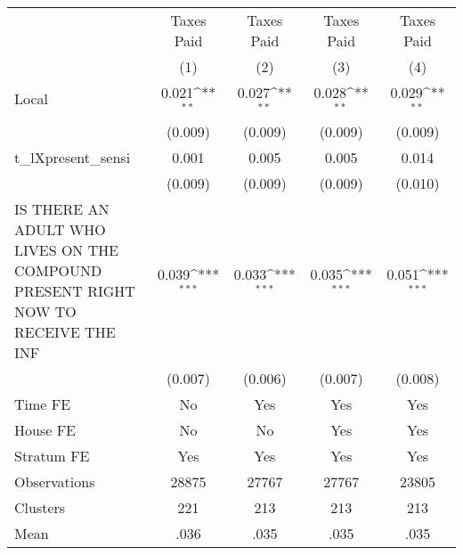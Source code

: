 {
\def\sym#1{\ifmmode^{#1}\else\(^{#1}\)\fi}
\begin{tabular}{l*{4}{c}}
\hline\hline
                &\multicolumn{1}{c}{Taxes Paid}&\multicolumn{1}{c}{Taxes Paid}&\multicolumn{1}{c}{Taxes Paid}&\multicolumn{1}{c}{Taxes Paid}\\
                &\multicolumn{1}{c}{(1)}         &\multicolumn{1}{c}{(2)}         &\multicolumn{1}{c}{(3)}         &\multicolumn{1}{c}{(4)}         \\
\hline
Local           &    0.021\sym{**} &    0.027\sym{**} &    0.028\sym{**} &    0.029\sym{**} \\
                &  (0.009)         &  (0.009)         &  (0.009)         &  (0.009)         \\
t\_lXpresent\_sensi&    0.001         &    0.005         &    0.005         &    0.014         \\
                &  (0.009)         &  (0.009)         &  (0.009)         &  (0.010)         \\
IS THERE AN ADULT WHO LIVES ON THE COMPOUND PRESENT RIGHT NOW TO RECEIVE THE INF&    0.039\sym{***}&    0.033\sym{***}&    0.035\sym{***}&    0.051\sym{***}\\
                &  (0.007)         &  (0.006)         &  (0.007)         &  (0.008)         \\
Time FE         &       No         &      Yes         &      Yes         &      Yes         \\
House FE        &       No         &       No         &      Yes         &      Yes         \\
Stratum FE      &      Yes         &      Yes         &      Yes         &      Yes         \\
\hline
Observations    &    28875         &    27767         &    27767         &    23805         \\
Clusters        &      221         &      213         &      213         &      213         \\
Mean            &     .036         &     .035         &     .035         &     .035         \\
\hline\hline
\end{tabular}
}
